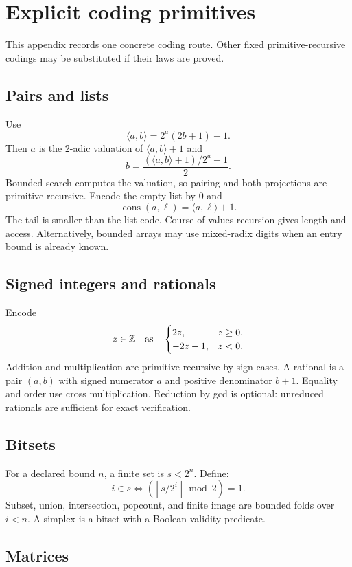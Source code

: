 
\section{Explicit coding primitives}
\label{app:coding}

This appendix records one concrete coding route.  Other fixed primitive-recursive codings may be substituted if their laws are proved.

\subsection{Pairs and lists}

Use
\[
  \langle a,b\rangle=2^a(2b+1)-1.
\]
Then $a$ is the $2$-adic valuation of $\langle a,b\rangle+1$ and
\[
  b=\frac{(\langle a,b\rangle+1)/2^a-1}{2}.
\]
Bounded search computes the valuation, so pairing and both projections are primitive recursive.  Encode the empty list by $0$ and
\[
  \operatorname{cons}(a,\ell)=\langle a,\ell\rangle+1.
\]
The tail is smaller than the list code.  Course-of-values recursion gives length and access.  Alternatively, bounded arrays may use mixed-radix digits when an entry bound is already known.

\subsection{Signed integers and rationals}

Encode
\[
  z\in\mathbb{Z}
  \quad\text{as}\quad
  \begin{cases}
  2z,&z\geq0,\\
  -2z-1,&z<0.
  \end{cases}
\]
Addition and multiplication are primitive recursive by sign cases.  A rational is a pair $(a,b)$ with signed numerator $a$ and positive denominator $b+1$.  Equality and order use cross multiplication.  Reduction by gcd is optional: unreduced rationals are sufficient for exact verification.

\subsection{Bitsets}

For a declared bound $n$, a finite set is $s<2^n$.  Define:
\[
  i\in s\iff \left(\left\lfloor s/2^i\right\rfloor\bmod2\right)=1.
\]
Subset, union, intersection, popcount, and finite image are bounded folds over $i<n$.  A simplex is a bitset with a Boolean validity predicate.

\subsection{Matrices}

